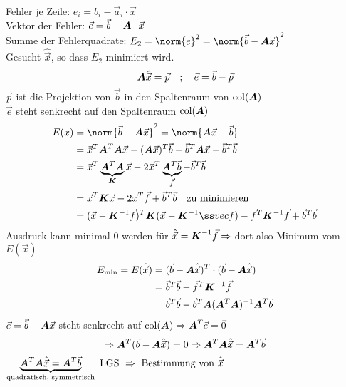 Fehler je Zeile: $e_i = b_i - \vec a_i\cdot \vec x$\\
Vektor der Fehler: $\vec e = \vec b - \boldsymbol {A}\cdot \vec x$\\
Summe der Fehlerquadrate: $E_2 = \norm{e}^2 = \norm{\vec b - \ma A\vec x}^2$\\
Gesucht $\hat{\vec x}$, so dass $E_2$ minimiert wird.
\begin{equation}
\boldsymbol {A}\hat{\vec x} = \vec p \quad ; \quad \vec e = \vec b - \vec p
\end{equation}
$\vec p$ ist die Projektion von $\vec b$ in den Spaltenraum von $\operatorname{col}(\boldsymbol {A})$\\
$\vec e$ steht senkrecht auf den Spaltenraum $\operatorname{col}(\boldsymbol {A})$
\begin{equation}
\begin{split}
E(x) &= \norm{\vec b - \ma A\vec x}^2 = \norm{\ma A\vec x - \vec b}\\
&= \vec x^T\ma A^T\ma A\vec x - (\ma A\vec x)^T\vec b - \vec b^T\ma A\vec x - \vec b^T\vec b\\
&= \vec x^T\underbrace{\ma A^T\ma A}_{\ma K}\vec x - 2\vec x^T\underbrace{\ma A^T\vec b}_{\vec f} - \vec b^T\vec b\\
&= \vec x^T\ma K\vec x - 2\vec x^T\vec f + \vec b^T\vec b\quad\text{zu minimieren}\\
&= (\vec x-\ma K^{-1}\vec f)^T\ma K(\vec x-\ma K^{-1}ßvec f) - \vec f^T\ma K^{-1}\vec f + \vec b^T\vec b
\end{split}
\end{equation}
Ausdruck kann minimal 0 werden für $\hat{\vec x} = \boldsymbol {K}^{-1}\vec f\Rightarrow$ dort also Minimum vom $E(\vec x)$
\begin{equation}
\begin{split}
E_\text{min} = E(\hat{\vec x}) &= (\vec b - \boldsymbol {A}\hat{\vec x})^T\cdot(\vec b - \boldsymbol {A}\hat{\vec x})\\
&= \vec b^T\vec b - \vec f^T\boldsymbol {K}^{-1}\vec f\\
&= \vec b^T\vec b - \vec b^T\boldsymbol {A}(\boldsymbol {A}^T\boldsymbol {A})^{-1}\boldsymbol {A}^T\vec b
\end{split}
\end{equation}
$\vec e = \vec b - \boldsymbol {A}\vec x$ steht senkrecht auf $\operatorname{col}(\boldsymbol {A})\Rightarrow\boldsymbol {A}^T\vec e = \vec 0$\\
\begin{equation}
\Rightarrow \boldsymbol {A}^T(\vec b - \boldsymbol {A}\hat{\vec x}) = 0 \Rightarrow \boldsymbol {A}^T\boldsymbol {A}\hat{\vec x} = \boldsymbol {A}^T\vec b
\end{equation}
$\underbrace{\boldsymbol {A}^T\boldsymbol {A}\hat{\vec x} = \boldsymbol {A}^T\vec b}_{\text{quadratisch, symmetrisch}} \text{ LGS }\Rightarrow\text{ Bestimmung von }\hat{\vec x}$

